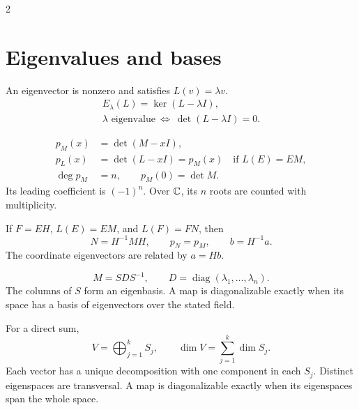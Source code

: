 \begin{fullwidth}
\begin{multicols}{2}
    \columnbreak
    \section{Eigenvalues and bases}
    \label{sec:appendix:formula-sheet-eigenvalues-and-bases}

    An eigenvector is nonzero and satisfies \(L(v)=\lambda v\).
    \[
      \begin{gathered}
        E_\lambda(L)=\ker(L-\lambda I),\\
        \lambda\text{ eigenvalue}\ \Longleftrightarrow\ \det(L-\lambda I)=0.
      \end{gathered}
    \]

    \[
      \begin{aligned}
        p_M(x)&=\det(M-xI),\\
        p_L(x)&=\det(L-xI)=p_M(x)\quad\text{if \(L(E)=EM\)},\\
        \deg p_M&=n,\qquad p_M(0)=\det M.
      \end{aligned}
    \]
    Its leading coefficient is \((-1)^n\). Over \(\mathbb{C}\), its \(n\)
    roots are counted with multiplicity.

    If \(F=EH\), \(L(E)=EM\), and \(L(F)=FN\), then
    \[
      N=H^{-1}MH,\qquad p_N=p_M,\qquad b=H^{-1}a.
    \]
    The coordinate eigenvectors are related by \(a=Hb\).

    \[
      M=SDS^{-1},\qquad D=\operatorname{diag}(\lambda_1,\ldots,\lambda_n).
    \]
    The columns of \(S\) form an eigenbasis. A map is diagonalizable
    exactly when its space has a basis of eigenvectors over the stated field.

    For a direct sum,
    \[
      V=\bigoplus_{j=1}^k S_j,\qquad
      \dim V=\sum_{j=1}^k\dim S_j.
    \]
    Each vector has a unique decomposition with one component in each \(S_j\).
    Distinct eigenspaces are transversal. A map is diagonalizable exactly
    when its eigenspaces span the whole space.
  \end{multicols}
\end{fullwidth}
\clearpage
